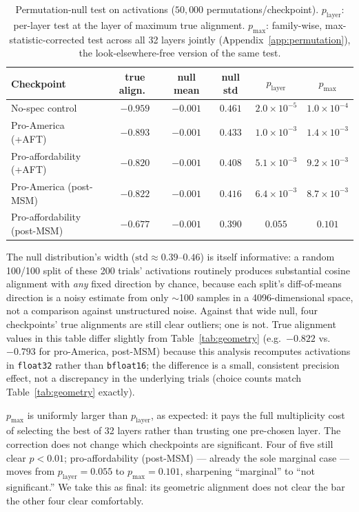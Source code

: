 \documentclass{article}
\begin{document}
\begin{table}[h]
\centering
\caption{Permutation-null test on activations ($50{,}000$ permutations/checkpoint). $p_{\text{layer}}$: per-layer test at the layer of maximum true alignment. $p_{\max}$: family-wise, max-statistic-corrected test across all 32 layers jointly (Appendix~\ref{app:permutation}), the look-elsewhere-free version of the same test.}
\label{tab:permutation}
\small
\begin{tabular}{lccccc}
\toprule
Checkpoint & true align.\ & null mean & null std & $p_{\text{layer}}$ & $p_{\max}$ \\
\midrule
No-spec control & $-0.959$ & $-0.001$ & $0.461$ & $2.0{\times}10^{-5}$ & $1.0{\times}10^{-4}$ \\
Pro-America (+AFT) & $-0.893$ & $-0.001$ & $0.433$ & $1.0{\times}10^{-3}$ & $1.4{\times}10^{-3}$ \\
Pro-affordability (+AFT) & $-0.820$ & $-0.001$ & $0.408$ & $5.1{\times}10^{-3}$ & $9.2{\times}10^{-3}$ \\
Pro-America (post-MSM) & $-0.822$ & $-0.001$ & $0.416$ & $6.4{\times}10^{-3}$ & $8.7{\times}10^{-3}$ \\
Pro-affordability (post-MSM) & $-0.677$ & $-0.001$ & $0.390$ & $0.055$ & $0.101$ \\
\bottomrule
\end{tabular}
\end{table}

The null distribution's width ($\text{std}\approx 0.39$--$0.46$) is itself informative: a random 100/100 split of these 200 trials' activations routinely produces substantial cosine alignment with \emph{any} fixed direction by chance, because each split's diff-of-means direction is a noisy estimate from only $\sim$100 samples in a 4096-dimensional space, not a comparison against unstructured noise. Against that wide null, four checkpoints' true alignments are still clear outliers; one is not. True alignment values in this table differ slightly from Table~\ref{tab:geometry} (e.g.\ $-0.822$ vs.\ $-0.793$ for pro-America, post-MSM) because this analysis recomputes activations in \texttt{float32} rather than \texttt{bfloat16}; the difference is a small, consistent precision effect, not a discrepancy in the underlying trials (choice counts match Table~\ref{tab:geometry} exactly).

$p_{\max}$ is uniformly larger than $p_{\text{layer}}$, as expected: it pays the full multiplicity cost of selecting the best of 32 layers rather than trusting one pre-chosen layer. The correction does not change which checkpoints are significant. Four of five still clear $p<0.01$; pro-affordability (post-MSM) --- already the sole marginal case --- moves from $p_{\text{layer}}{=}0.055$ to $p_{\max}{=}0.101$, sharpening ``marginal'' to ``not significant.'' We take this as final: its geometric alignment does not clear the bar the other four clear comfortably.
\end{document}
